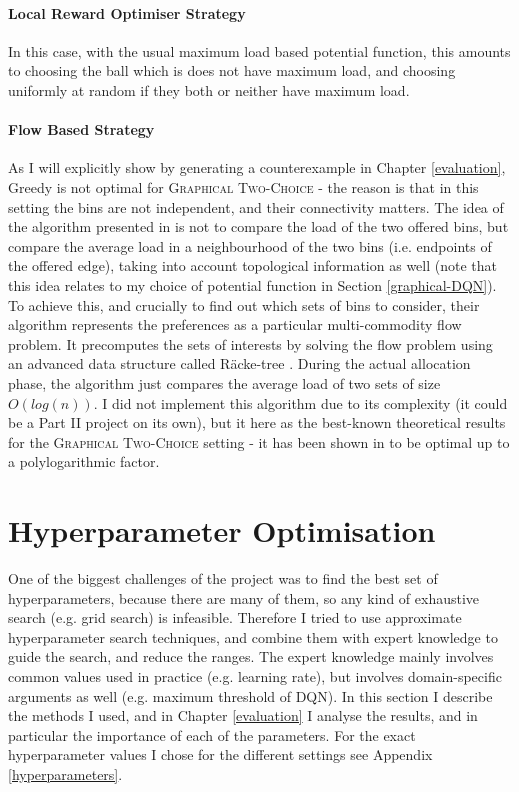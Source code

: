 \paragraph{Local Reward Optimiser Strategy} In this case, with the usual maximum load based potential function, this amounts to choosing the ball which is does not have maximum load, and choosing uniformly at random if they both or neither have maximum load.


\paragraph{Flow Based Strategy}

As I will explicitly show by generating a counterexample in Chapter \ref{evaluation}, Greedy is not optimal for \textsc{Graphical Two-Choice} - the reason is that in this setting the bins are not independent, and their connectivity matters. The idea of the algorithm presented in \cite{bansal2021twochoicegraphical} is not to compare the load of the two offered bins, but compare the average load in a neighbourhood of the two bins (i.e. endpoints of the offered edge), taking into account topological information as well (note that this idea relates to my choice of potential function in Section \ref{graphical-DQN}). To achieve this, and crucially to find out which sets of bins to consider, their algorithm represents the preferences as a particular multi-commodity flow problem. It precomputes the sets of interests by solving the flow problem using an advanced data structure called R\"{a}cke-tree \cite{racke2008racketree}. During the actual allocation phase, the algorithm just compares the average load of two sets of size $O(log(n))$. I did not implement this algorithm due to its complexity (it could be a Part II project on its own), but it here as the best-known theoretical results for the \textsc{Graphical Two-Choice} setting - it has been shown in \cite{bansal2021twochoicegraphical} to be optimal up to a polylogarithmic factor.



\section{Hyperparameter Optimisation}

One of the biggest challenges of the project was to find the best set of hyperparameters, because there are many of them, so any kind of exhaustive search (e.g. grid search) is infeasible. Therefore I tried to use approximate hyperparameter search techniques, and combine them with expert knowledge to guide the search, and reduce the ranges. The expert knowledge mainly involves common values used in practice (e.g. learning rate), but involves domain-specific arguments as well (e.g. maximum threshold of DQN). In this section I describe the methods I used, and in Chapter \ref{evaluation} I analyse the results, and in particular the importance of each of the parameters. For the exact hyperparameter values I chose for the different settings see Appendix \ref{hyperparameters}.


